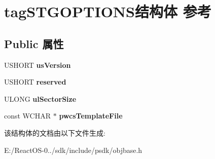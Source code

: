 \hypertarget{structtag_s_t_g_o_p_t_i_o_n_s}{}\section{tag\+S\+T\+G\+O\+P\+T\+I\+O\+N\+S结构体 参考}
\label{structtag_s_t_g_o_p_t_i_o_n_s}
\subsection*{Public 属性}
\begin{DoxyCompactItemize}
\item 
\mbox{\label{structtag_s_t_g_o_p_t_i_o_n_s_abeb2c4ca47272d3aa655f243b78463c3}} 
U\+S\+H\+O\+RT {\bfseries us\+Version}
\item 
\mbox{\label{structtag_s_t_g_o_p_t_i_o_n_s_a5283c69c3f0e57444bc56ec4ac14b6e2}} 
U\+S\+H\+O\+RT {\bfseries reserved}
\item 
\mbox{\label{structtag_s_t_g_o_p_t_i_o_n_s_aa795789bdb5de0a67c95827b9ac9cb38}} 
U\+L\+O\+NG {\bfseries ul\+Sector\+Size}
\item 
\mbox{\label{structtag_s_t_g_o_p_t_i_o_n_s_a777a0e13216692a560f1f0313ace3243}} 
const W\+C\+H\+AR $\ast$ {\bfseries pwcs\+Template\+File}
\end{DoxyCompactItemize}


该结构体的文档由以下文件生成\+:\begin{DoxyCompactItemize}
\item 
E\+:/\+React\+O\+S-\/0../sdk/include/psdk/objbase.\+h\end{DoxyCompactItemize}

